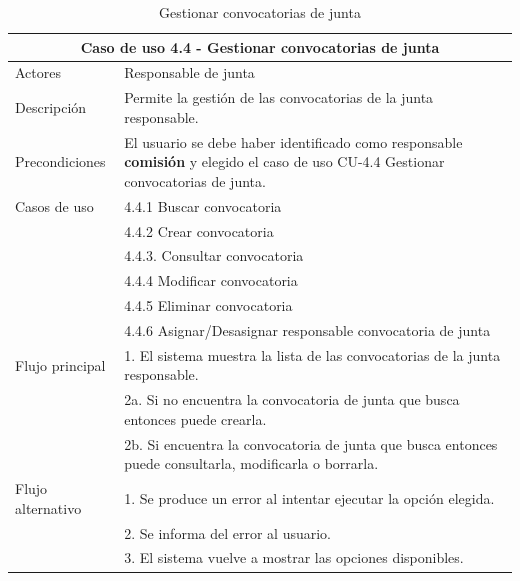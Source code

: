 \begin{table}[H]
    \caption{Gestionar convocatorias de junta}
    \label{tab:CU-4.4}
    \begin{center}
        \begin{tabular}{|l|p{12cm}|}
            \hline
            \multicolumn{2}{|c|}{Caso de uso 4.4 - Gestionar convocatorias de junta} \\
            \hline \hline
            Actores                 &   Responsable de junta          \\  
            \hline
            Descripción             &   Permite la gestión de las convocatorias de la junta responsable. \\  \hline
            Precondiciones          &   El usuario se debe haber identificado como responsable \textbf{comisión} y elegido el caso de uso CU-4.4 Gestionar convocatorias de junta. \\  \hline
            Casos de uso            & 
            4.4.1 Buscar convocatoria \\ 
            &
            4.4.2 Crear convocatoria \\ 
            & 
            4.4.3. Consultar convocatoria\\ 
            & 
            4.4.4 Modificar convocatoria \\ 
            &  
            4.4.5 Eliminar convocatoria \\ 
            &
            4.4.6 Asignar/Desasignar responsable convocatoria de junta \\
            \hline
   
            Flujo principal         &   1. El sistema muestra la lista de las convocatorias de la junta responsable.   \\ 
            & 2a. Si no encuentra la convocatoria de junta que busca entonces puede crearla. \\ 
            & 2b. Si encuentra la convocatoria de junta que busca entonces puede consultarla, modificarla o borrarla. \\ \hline
            Flujo alternativo    &   1. Se produce un error al intentar ejecutar la opción elegida.  \\ 
            & 2. Se informa del error al usuario. \\
            & 3. El sistema vuelve a mostrar las opciones disponibles. \\
            \hline
        \end{tabular}
    \end{center}
\end{table}

